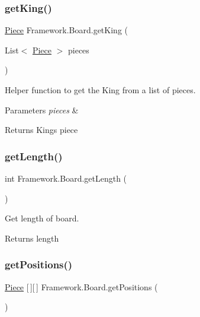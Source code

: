 \subsubsection{\texorpdfstring{get\+King()}{getKing()}}
{\footnotesize\ttfamily \hyperlink{class_framework_1_1_pieces_1_1_piece}{Piece} Framework.\+Board.\+get\+King (\begin{DoxyParamCaption}\item[{List$<$ \hyperlink{class_framework_1_1_pieces_1_1_piece}{Piece} $>$}]{pieces }\end{DoxyParamCaption})}

Helper function to get the King from a list of pieces. 
\begin{DoxyParams}{Parameters}
{\em pieces} & \\
\hline
\end{DoxyParams}
\begin{DoxyReturn}{Returns}
King\textquotesingle{}s piece 
\end{DoxyReturn}
\hypertarget{class_framework_1_1_board_a208745491f96b28d4f3ec8cbbb55b657}{}\label{class_framework_1_1_board_a208745491f96b28d4f3ec8cbbb55b657} 
\subsubsection{\texorpdfstring{get\+Length()}{getLength()}}
{\footnotesize\ttfamily int Framework.\+Board.\+get\+Length (\begin{DoxyParamCaption}{ }\end{DoxyParamCaption})}

Get length of board. \begin{DoxyReturn}{Returns}
length 
\end{DoxyReturn}
\hypertarget{class_framework_1_1_board_af250d25ffe26de66b28abb81fa3f741b}{}\label{class_framework_1_1_board_af250d25ffe26de66b28abb81fa3f741b} 
\subsubsection{\texorpdfstring{get\+Positions()}{getPositions()}}
{\footnotesize\ttfamily \hyperlink{class_framework_1_1_pieces_1_1_piece}{Piece} \mbox{[}$\,$\mbox{]}\mbox{[}$\,$\mbox{]} Framework.\+Board.\+get\+Positions (\begin{DoxyParamCaption}{ }\end{DoxyParamCaption})}

